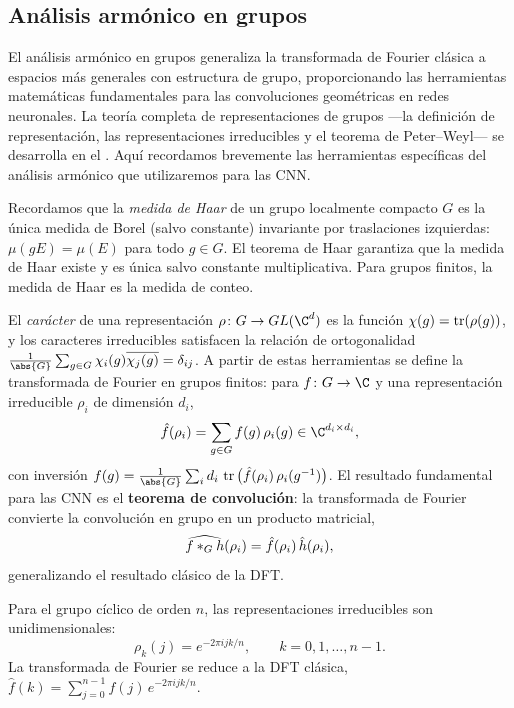 \subsection{An\'alisis arm\'onico en grupos}
\label{sec:grids:harmonic-groups}

El an\'alisis arm\'onico en grupos generaliza la transformada de Fourier
cl\'asica a espacios m\'as generales con estructura de grupo, proporcionando las
herramientas matem\'aticas fundamentales para las convoluciones geom\'etricas en
redes neuronales. La teor\'ia completa de representaciones de grupos ---la
definici\'on de representaci\'on, las representaciones irreducibles y el teorema
de Peter--Weyl--- se desarrolla en el . Aqu\'i recordamos
brevemente las herramientas espec\'ificas del an\'alisis arm\'onico que
utilizaremos para las CNN.

Recordamos que la \emph{medida de Haar} de un grupo localmente compacto $G$ es
la \'unica medida de Borel (salvo constante) invariante por traslaciones
izquierdas: $\mu(gE) = \mu(E)$ para todo $g \in G$. El teorema de Haar garantiza
que la medida de Haar existe y es \'unica salvo constante multiplicativa. Para
grupos finitos, la medida de Haar es la medida de conteo.

El \emph{car\'acter} de una representaci\'on $\rho \colon G \to GL(\C^d)$ es la
funci\'on $\chi(g) = \operatorname{tr}(\rho(g))$, y los caracteres irreducibles satisfacen la
relaci\'on de ortogonalidad $\frac{1}{\abs{G}} \sum_{g \in G} \chi_i(g)
\overline{\chi_j(g)} = \delta_{ij}$. A partir de estas herramientas se define la
transformada de Fourier en grupos finitos: para $f \colon G \to \C$ y una
representaci\'on irreducible $\rho_i$ de dimensi\'on $d_i$,
\begin{equation}
  \hat{f}(\rho_i) = \sum_{g\in G} f(g)\,\rho_i(g) \in \C^{d_i \times d_i},
  \label{eq:grids:fourier-finite-group}
\end{equation}
con inversi\'on $f(g) = \frac{1}{\abs{G}} \sum_i d_i\, \tr\big(\hat{f}(\rho_i)\,
\rho_i(g^{-1})\big)$. El resultado fundamental para las CNN es el \textbf{teorema
de convoluci\'on}: la transformada de Fourier convierte la convoluci\'on en
grupo en un producto matricial,
\begin{equation}
  \widehat{f *_G h}(\rho_i) = \hat{f}(\rho_i)\, \hat{h}(\rho_i),
  \label{eq:grids:conv-fourier-groups}
\end{equation}
generalizando el resultado cl\'asico de la DFT.

\begin{example}
\label{ex:grids:cyclic-group}
Para el grupo c\'iclico de orden $n$, las representaciones irreducibles son
unidimensionales:
\[
  \rho_k(j) = e^{-2\pi i jk/n}, \qquad k = 0, 1, \ldots, n-1.
\]
La transformada de Fourier se reduce a la DFT cl\'asica,
$\hat{f}(k) = \sum_{j=0}^{n-1} f(j)\, e^{-2\pi i jk/n}$.
\end{example}

